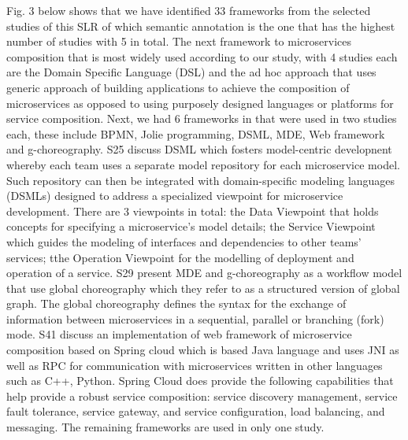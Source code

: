 \documentclass{article}
\begin{document}
\begin{multicols}{2}
Fig. 3 below shows that we have identified 33 frameworks from the selected studies of this SLR of which semantic annotation is the one that has the highest number of studies with 5 in total. The next framework to microservices composition that is most widely used according to our study, with 4 studies each are the Domain Specific Language (DSL) and the ad hoc approach that uses generic approach of building applications to achieve the composition of microservices as opposed to using purposely designed languages or platforms for service composition. Next, we had 6 frameworks in that were used in two studies each, these include BPMN, Jolie programming, DSML, MDE, Web framework and g-choreography. S25 discuss DSML which fosters model-centric developnent whereby each team uses a separate model repository for each microservice model. Such repository can then be integrated with domain-specific modeling languages (DSMLs) designed to address  a specialized viewpoint for microservice development. There are 3 viewpoints in total: the Data Viewpoint that holds concepts for specifying a microservice’s model details; the Service Viewpoint which guides the modeling of interfaces and dependencies to other teams’ services; tthe Operation Viewpoint for the modelling of deployment and operation of a service.
S29 present MDE and g-choreography as a workflow model that use global choreography which they refer to as a structured version of global graph. The global choreography defines the syntax for the exchange of information between microservices in a sequential, parallel or branching (fork) mode. 
S41 discuss an implementation of web framework of microservice composition based on Spring cloud which is based Java language and uses 
JNI as well as RPC for communication with microservices written in other languages such as C++, Python. Spring Cloud does provide the following capabilities that help provide a robust service composition: service discovery management, service fault tolerance, service gateway, and service configuration, load balancing, and messaging. The remaining frameworks are used in only one study. 


\end{multicols}
\end{document}
